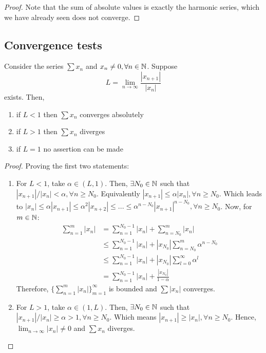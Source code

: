 \begin{proof}
    Note that the sum of absolute values is exactly the harmonic series, which we have already seen does not converge. 
\end{proof}

\subsection{Convergence tests}

\begin{theorem}
    Consider the series $\sum x_n$ and $x_n \neq 0, \forall n \in \mathbb{N}$. Suppose
    \begin{equation}
        L = \lim \limits_{n \to \infty} \frac{|x_{n+1}|}{|x_n|}
    \end{equation}
    exists. Then,
    \begin{enumerate}
        \item if $L < 1$ then $\sum x_n$ converges absolutely
        \item if $L > 1$ then $\sum x_n$ diverges
        \item if $L = 1$ no assertion can be made
    \end{enumerate}
\end{theorem}

\begin{proof}
    Proving the first two statements:
    \begin{enumerate}
        \item For $L < 1$, take $\alpha \in (L, 1)$. Then, $\exists N_0 \in \mathbb{N}$ such that $|x_{n+1}|/|x_n| < \alpha, \forall n \geq N_0$. Equivalently $|x_{n+1}| \leq \alpha |x_n|, \forall n \geq N_0$. Which leads to $|x_n| \leq \alpha |x_{n+1}| \leq \alpha^2 |x_{n+2}| \leq ... \leq \alpha^{n-N_0} |x_{n+1}|^{n-N_0}, \forall n \geq N_0$. Now, for $m \in \mathbb{N}$:
        \begin{align*}
            \sum \limits_{n=1}^m |x_n| &= \sum \limits_{n=1}^{N_0-1}|x_n| + \sum \limits_{n=N_0}^{m}|x_n| \\
            &\leq \sum \limits_{n=1}^{N_0-1}|x_n| + |x_{N_0}| \sum \limits_{n=N_0}^{m} \alpha^{n-N_0} \\
            &\leq \sum \limits_{n=1}^{N_0-1}|x_n| + |x_{N_0}| \sum \limits_{l=0}^{\infty} \alpha^l \\
            &= \sum \limits_{n=1}^{N_0-1}|x_n| + \frac{|x_{N_0}|}{1-\alpha}
        \end{align*}
        Therefore, $\{ \sum_{n=1}^m |x_n|\}_{m=1}^\infty$ is bounded and $\sum |x_n|$ converges.
        \item For $L > 1$, take $\alpha \in (1, L)$. Then, $\exists N_0 \in \mathbb{N}$ such that $|x_{n+1}|/|x_n| \geq \alpha > 1, \forall n \geq N_0$. Which means $|x_{n+1}| \geq |x_n|, \forall n \geq N_0$. Hence, $\lim_{n \to \infty} |x_n| \neq 0$ and $\sum x_n$ diverges.
    \end{enumerate}
\end{proof}

